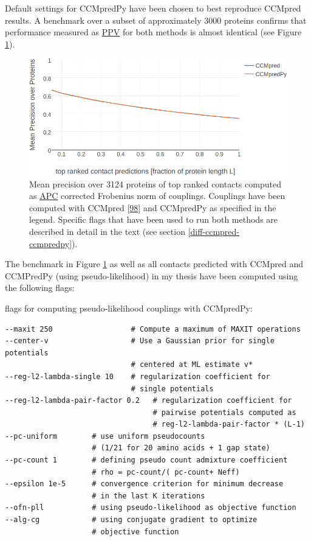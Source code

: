 \documentclass[11pt,a4paper,twoside]{book}
\theoremstyle{definition}
\theoremstyle{definition}
\theoremstyle{remark}
\begin{document}
Default settings for CCMpredPy have been chosen to best reproduce
CCMpred results. A benchmark over a subset of approximately 3000
proteins confirms that performance measured as
\protect\hyperlink{abbrev}{PPV} for both methods is almost identical
(see Figure \ref{fig:cmmpredvanilla-vs-ccmpredpy}).










\begin{figure}
\includegraphics[width=1\linewidth]{img/methods/ccmpredvanilla_vs_ccmpredpy_precision_vs_rank} \caption{Mean precision over 3124
proteins of top ranked contacts computed as
\protect\hyperlink{abbrev}{APC} corrected Frobenius norm of couplings.
Couplings have been computed with CCMpred
{[}\protect\hyperlink{ref-Seemayer2014}{98}{]} and CCMpredPy as
specified in the legend. Specific flags that have been used to run both
methods are described in detail in the text (see section
\ref{diff-ccmpred-ccmpredpy}).}\label{fig:cmmpredvanilla-vs-ccmpredpy}
\end{figure}

The benchmark in Figure \ref{fig:cmmpredvanilla-vs-ccmpredpy} as well as
all contacts predicted with CCMpred and CCMPredPy (using
pseudo-likelihood) in my thesis have been computed using the following
flags:

flags for computing pseudo-likelihood couplings with CCMpredPy:

\begin{verbatim}
--maxit 250                  # Compute a maximum of MAXIT operations
--center-v                   # Use a Gaussian prior for single potentials 
                             # centered at ML estimate v*          
--reg-l2-lambda-single 10    # regularization coefficient for 
                             # single potentials
--reg-l2-lambda-pair-factor 0.2   # regularization coefficient for 
                                  # pairwise potentials computed as 
                                  # reg-l2-lambda-pair-factor * (L-1)
--pc-uniform        # use uniform pseudocounts 
                    # (1/21 for 20 amino acids + 1 gap state) 
--pc-count 1        # defining pseudo count admixture coefficient 
                    # rho = pc-count/( pc-count+ Neff)
--epsilon 1e-5      # convergence criterion for minimum decrease 
                    # in the last K iterations
--ofn-pll           # using pseudo-likelihood as objective function
--alg-cg            # using conjugate gradient to optimize 
                    # objective function
\end{verbatim}
\end{document}
